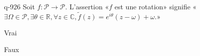 \begin{truefalse}{q-926}
Soit $f:\mathcal P\to \mathcal P$. L'assertion «$f$ est une rotation» signifie «$\exists \Omega\in\mathcal P, \exists \theta\in\mathbb R, \forall z\in\mathbb C, \tilde f(z)=e^{i\theta}(z-\omega)+\omega$.»
\item* Vrai
\item Faux
\end{truefalse}


